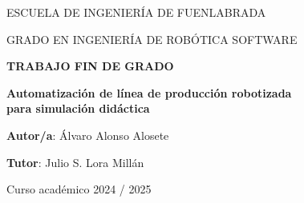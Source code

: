 \thispagestyle{empty}
\vspace{2cm}

\begin{figure}[htb]
  \centerline{}
\end{figure}

\begin{center}
  \vspace{5mm}
    {\Large {ESCUELA DE INGENIERÍA DE FUENLABRADA}}
  \vspace{1cm}
  
  {\Large {GRADO EN INGENIERÍA DE ROBÓTICA SOFTWARE}}
  \vspace{20mm}

   {\Large {\textbf{TRABAJO FIN DE GRADO}}}


   \vspace{2cm}

  {\large \textbf{Automatización de línea de producción robotizada  \\
              para simulación didáctica }}

  \vspace{2cm}
  
  {\bf Autor/a}: Álvaro Alonso Alosete
  
  {\bf Tutor}: Julio S. Lora Millán 

\vspace{3cm}

  Curso académico 2024 / 2025

 
\end{center}

\clearpage
\thispagestyle{empty}
